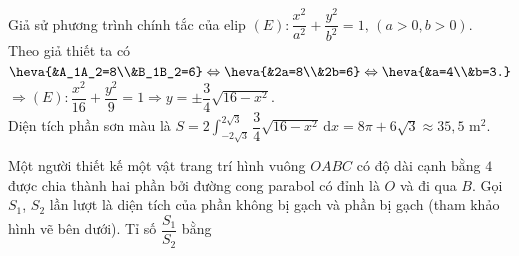 \begin{ex}
{Giả sử phương trình chính tắc của elip $(E)\colon \dfrac{x^2}{a^2}+\dfrac{y^2}{b^2}=1,\,(a>0,b>0)$.\\
Theo giả thiết ta có $\heva{&A_1A_2=8\\&B_1B_2=6}\Leftrightarrow \heva{&2a=8\\&2b=6}\Leftrightarrow \heva{&a=4\\&b=3.}$\\
$\Rightarrow (E)\colon \dfrac{x^2}{16}+\dfrac{y^2}{9}=1\Rightarrow y=\pm \dfrac{3}{4}\sqrt{16-x^2}$.\\
Diện tích phần sơn màu là $\displaystyle S=2\int_{-2\sqrt{3}}^{2\sqrt{3}}\dfrac{3}{4}\sqrt{16-x^2}\mathrm{\,d}x =8\pi+6\sqrt{3}\approx 35{,}5$ m$^2$.\\
}
\end{ex}

\begin{ex}%
Một người thiết kế một vật trang trí hình vuông $ OABC $ có độ dài cạnh bằng $4$ được chia thành hai phần bởi đường cong parabol có đỉnh là $O$ và đi qua $B$. Gọi $ S_1 $, $ S_2 $ lần lượt là diện tích của phần không bị gạch và phần bị gạch (tham khảo hình vẽ bên dưới). Tỉ số $ \dfrac{S_1}{S_2} $ bằng
\begin{center}
\end{center}
\end{ex}

